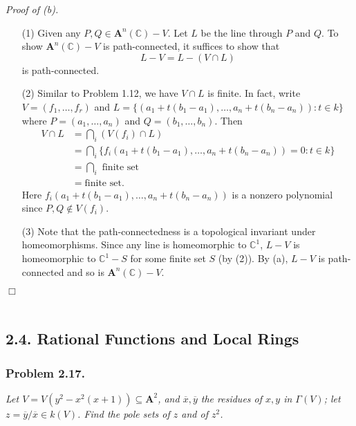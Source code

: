 \documentclass{article}
\begin{document}
\emph{Proof of (b).}
\begin{enumerate}
\item[(1)]
  Given any $P, Q \in \mathbf{A}^n(\mathbb{C}) - V$.
  Let $L$ be the line through $P$ and $Q$.
  To show $\mathbf{A}^n(\mathbb{C}) - V$ is path-connected,
  it suffices to show that
  \[
    L - V = L - (V \cap L)
  \]
  is path-connected.

\item[(2)]
  Similar to Problem 1.12, we have $V \cap L$ is finite.
  In fact, write $V = (f_1, \ldots, f_r)$ and
  $L = \{ ( a_1 + t(b_1-a_1), \ldots, a_n + t(b_n-a_n) ) : t \in k \}$
  where $P = (a_1, \ldots, a_n)$ and $Q = (b_1, \ldots, b_n)$.
  Then
  \begin{align*}
    V \cap L
    &= \bigcap_{i} (V(f_i) \cap L) \\
    &= \bigcap_{i} \{ f_i(a_1 + t(b_1-a_1), \ldots, a_n + t(b_n-a_n)) = 0 : t \in k \} \\
    &= \bigcap_{i} \text{ finite set } \\
    &= \text{finite set}.
  \end{align*}
  Here $f_i(a_1 + t(b_1-a_1), \ldots, a_n + t(b_n-a_n))$ is a nonzero polynomial
  since $P, Q \not\in V(f_i)$.

\item[(3)]
  Note that the path-connectedness is a topological invariant under homeomorphisms.
  Since any line is homeomorphic to $\mathbb{C}^1$,
  $L - V$ is homeomorphic to $\mathbb{C}^1 - S$ for some finite set $S$
  (by (2)).
  By (a), $L - V$ is path-connected and so is $\mathbf{A}^n(\mathbb{C}) - V$.
\end{enumerate}
$\Box$ \\\\






\subsection*{2.4. Rational Functions and Local Rings \\}



\subsubsection*{Problem 2.17.}
\emph{Let $V = V(y^2 - x^2(x+1)) \subseteq \mathbf{A}^{2}$,
and $\overline{x}, \overline{y}$ the residues of $x, y$ in $\Gamma(V)$;
let $z = \overline{y}/\overline{x} \in k(V)$.
Find the pole sets of $z$ and of $z^2$.} \\
\end{document}
